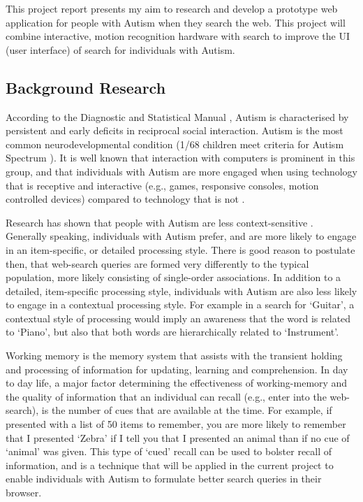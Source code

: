 \documentclass[a4paper, 11pt]{article}
\begin{document}
This project report presents my aim to research and develop a prototype web application for people with Autism when they search the web. This project will combine interactive, motion recognition hardware with search to improve the UI (user interface) of search for individuals with Autism. 

\subsection {Background Research}\label{background} 

According to the Diagnostic and Statistical Manual \cite{CDC}, Autism is characterised by persistent and early deficits in reciprocal social interaction. Autism is the most common neurodevelopmental condition (1/68 children meet criteria for Autism Spectrum \cite{CDC}). It is well known that interaction with computers is prominent in this group, and that individuals with Autism are more engaged when using technology that is receptive and interactive (e.g., games, responsive consoles, motion controlled devices) compared to technology that is not \cite{motioncontrollerforautism}. 

\vspace{5mm}
Research has shown that people with Autism are less context-sensitive \cite{mottron}. Generally speaking, individuals with Autism prefer, and are more likely to engage in an item-specific, or detailed processing style. There is good reason to postulate then, that web-search queries are formed very differently to the typical population, more likely consisting of single-order associations. In addition to a detailed, item-specific processing style, individuals with Autism are also less likely to engage in a contextual processing style. For example in a search for `Guitar', a contextual style of processing would imply an awareness that the word is related to `Piano', but also that both words are hierarchically related to `Instrument'. 

\vspace{5mm}
Working memory is the memory system that assists with the transient holding and processing of information for updating, learning and comprehension. In day to day life, a major factor determining the effectiveness of working-memory and the quality of information that an individual can recall (e.g., enter into the web-search), is the number of cues that are available at the time. For example, if presented with a list of 50 items to remember, you are more likely to remember that I presented `Zebra' if I tell you that I presented an animal than if no cue of `animal' was given. This type of `cued' recall can be used to bolster recall of information, and is a technique that will be applied in the current project to enable individuals with Autism to formulate better search queries in their browser. \\
\end{document}
